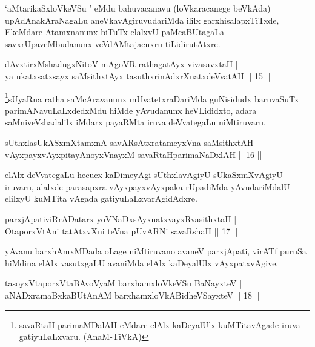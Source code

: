 \begin{artha}
`aMtarikaSxloVkeVSu ' eMdu bahuvacanavu (loVkaracanege beVkAda) upAdAnakAraNagaLu aneVkavAgiruvudariMda ililx garxhisalapxTiTxde, EkeMdare Atamxnanunx biTuTx elalxvU paMcaBUtagaLa savxrUpaveMbudanunx veVdAMtajacnxru tiLidirutAtxre.
\end{artha}

\begin{shl}
dAvxtirxMshadugxNitoV mAgoVR rathagatAyx vivasavxtaH |\\
ya ukatxsatxsayx saMsithxtAyx tasuthxrinAdxrXnatxdeVvatAH \hfill || 15 ||
\end{shl}

\begin{artha}
\footnote[1]{savaRtaH parimaMDalAH eMdare elAlx kaDeyalUlx kuMTitavAgade iruva gatiyuLaLxvaru. (AnaM-TiVkA)}sUyaRna ratha saMcAravanunx mUvatetxraDariMda guNisidudx baruvaSuTx parimANavuLaLxdedxMdu hiMde yAvudanunx heVLididxto, adara saMniveVshadalilx iMdarx payaRMta iruva deVvategaLu niMtiruvaru.
\end{artha}

\begin{shl}
sUthxlasUkASxmXtamxnA savARsAtxratameyxVna saMsithxtAH |\\
vAyxpayxvAyxpitayA\s noyxVnayxM savaRtaHparimaNaDxlAH \hfill || 16 ||
\end{shl}

\begin{artha}
elAlx deVvategaLu hecucx kaDimeyAgi sUthxlavAgiyU sUkaSxmXvAgiyU iruvaru, alalxde parasapxra vAyxpayxvAyxpaka rUpadiMda yAvudariMdalU elilxyU kuMTita vAgada gatiyuLaLxvarAgidAdxre.
\end{artha}


\begin{shl}
parxjApativiRrADatarx yoV\s NaDxsAyxnatxvayxRvasithxtaH |\\
OtaporxVtAni tatAtxvXni teVna pUvARNi savaRshaH \hfill || 17 ||
\end{shl}

\begin{artha}
yAvanu barxhAmxMDada oLage niMtiruvano avaneV parxjApati, virATf puruSa hiMdina elAlx vasutxgaLU avaniMda elAlx kaDeyalUlx vAyxpatxvAgive.
\end{artha}

\begin{shl}
tasoyxVtaporxVtaBAvoV\s yaM barxhamxloVkeVSu BaNayxteV |\\
aNADxramaBxkaBUtAnAM barxhamxloVkABidheVSayxteV \hfill || 18 ||
\end{shl}

